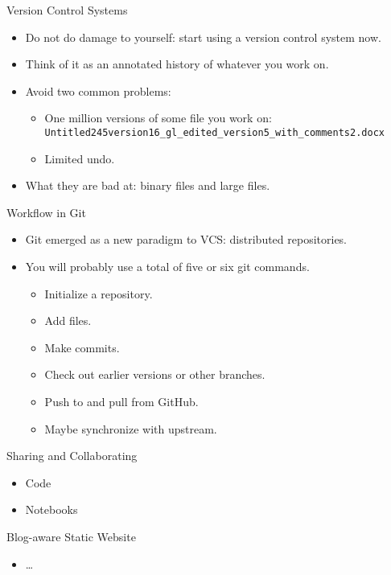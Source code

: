 \documentclass[compress,red]{beamer}\usetheme{Warsaw}\useoutertheme[subsection=false]{smoothbars}
\begin{document}
\begin{frame}[fragile]{Version Control Systems}
\begin{itemize}
\item Do not do damage to yourself: start using a version control system now.

\item Think of it as an annotated history of whatever you work on.

\item Avoid two common problems:
 \begin{itemize}
\item One million versions of some file you work on: {\scriptsize \verb+Untitled245version16_gl_edited_version5_with_comments2.docx+}

\item Limited undo.
\end{itemize}
\item What they are bad at: binary files and large files.
\end{itemize}
\end{frame}

\begin{frame}{Workflow in Git}
\begin{itemize}
\item Git emerged as a new paradigm to VCS: distributed repositories.
 
\item You will probably use a total of five or six git commands.
\begin{itemize}
  \item Initialize a repository.
  \item Add files.
  \item Make commits.
  \item Check out earlier versions or other branches.
  \item Push to and pull from GitHub.
  \item Maybe synchronize with upstream.
\end{itemize}
\end{itemize}
\end{frame}

\begin{frame}{Sharing and Collaborating}
\begin{itemize}
\item Code
\item Notebooks
\end{itemize}
\end{frame}

\begin{frame}{Blog-aware Static Website}
\begin{itemize}
\item \ldots
\end{itemize}
\end{frame}
\end{document}
